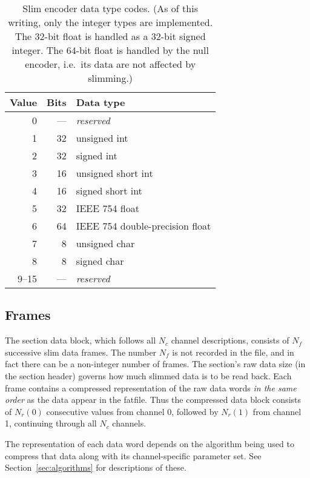 \documentclass[11pt]{article}
\begin{document}
\begin{table}[h]
  \centering
  \begin{tabular}{rrl}
    Value & Bits & Data type \\ \hline
    0 &  --- & \emph{reserved} \\
    1 & 32 & unsigned int \\
    2 & 32 & signed int \\
    3 & 16 & unsigned short int \\
    4 & 16 & signed short int \\
    5 & 32 & IEEE 754 float \\
    6 & 64 & IEEE 754 double-precision float \\
    7 &  8 & unsigned char \\
    8 &  8 & signed char \\
    9--15 &  --- & \emph{reserved} \\
  \end{tabular}
  \caption{\label{tab:types} Slim encoder data type codes.  (As of
    this writing, only the integer types are implemented.  The 32-bit
    float is handled as a 32-bit signed integer.  The 64-bit float is
    handled by the null encoder, i.e.\ its data are not affected by
    slimming.)}
\end{table}


\subsection{Frames}

The section data block, which follows all $N_c$ channel descriptions,
consists of $N_f$ successive slim data frames.  The number $N_f$ is
not recorded in the file, and in fact there can be a non-integer
number of frames.  The section's raw data size (in the section header)
governs how much slimmed data is to be read back.  Each frame contains a
compressed representation of the raw data words \emph{in the same
order} as the data appear in the fatfile.  Thus the compressed data
block consists of $N_r(0)$ consecutive values from channel 0, followed
by $N_r(1)$ from channel 1, continuing through all $N_c$ channels.

The representation of each data word depends on the algorithm being
used to compress that data along with its channel-specific parameter
set.  See Section~\ref{sec:algorithms} for descriptions of these.



\end{document}
